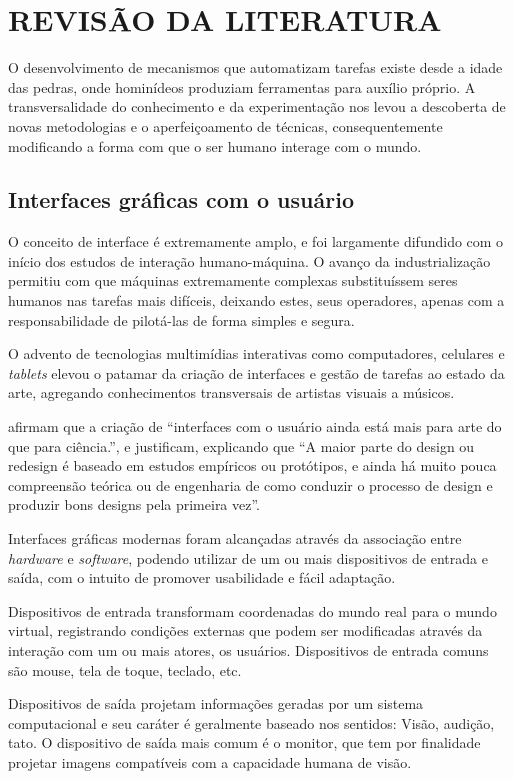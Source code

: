 \chapter{REVISÃO DA LITERATURA}

O desenvolvimento de mecanismos que automatizam tarefas existe desde a idade das
pedras, onde hominídeos produziam ferramentas para auxílio próprio. A
transversalidade do conhecimento e da experimentação nos levou a descoberta de
novas metodologias e o aperfeiçoamento de técnicas, consequentemente modificando
a forma com que o ser humano interage com o mundo.

\section{Interfaces gráficas com o usuário}

O conceito de interface é extremamente amplo, e foi largamente difundido com o
início dos estudos de interação humano-máquina. O avanço da industrialização
permitiu com que máquinas extremamente complexas substituíssem seres humanos nas
tarefas mais difíceis, deixando estes, seus operadores, apenas com a
responsabilidade de pilotá-las de forma simples e segura.

O advento de tecnologias multimídias interativas como computadores, celulares e
\textit{tablets} elevou o patamar da criação de interfaces e gestão de tarefas
ao estado da arte, agregando conhecimentos transversais de artistas visuais a
músicos.

 afirmam que a criação de ``interfaces
com o usuário ainda está mais para arte do que para ciência.'', e justificam,
explicando que ``A maior parte do design ou redesign é baseado em estudos
empíricos ou protótipos, e ainda há muito pouca compreensão teórica ou de
engenharia de como conduzir o processo de design e produzir bons designs pela
primeira vez''.

Interfaces gráficas modernas foram alcançadas através da associação entre
\textit{hardware} e \textit{software}, podendo utilizar de um ou mais
dispositivos de entrada e saída, com o intuito de promover usabilidade e fácil
adaptação.

Dispositivos de entrada transformam coordenadas do mundo real para o mundo
virtual, registrando condições externas que podem ser modificadas através da
interação com um ou mais atores, os usuários. Dispositivos de entrada comuns são
mouse, tela de toque, teclado, etc.

Dispositivos de saída projetam informações geradas por um sistema computacional
e seu caráter é geralmente baseado nos sentidos: Visão, audição, tato. O
dispositivo de saída mais comum é o monitor, que tem por finalidade projetar
imagens compatíveis com a capacidade humana de visão.

